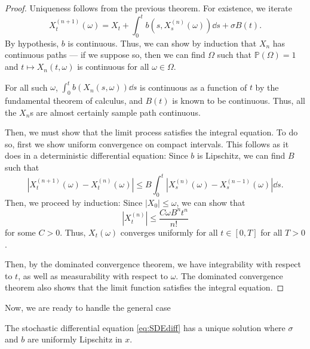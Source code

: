 \documentclass[prb,12pt]{revtex4-2}
\theoremstyle{definition}
\theoremstyle{definition}
\theoremstyle{definition}
\begin{document}
\begin{proof}
	Uniqueness follows from the previous theorem. For existence, we iterate
	\[
	X^{(n+1)}_t(\omega)=X_t+\int_0^t b(s, X^{(n)}_s(\omega))\dd{s}+\sigma B(t)
	.\] 
	By hypothesis, $b$ is continuous. Thus, we can show by induction that $X_n$ has continuous paths --- if we suppose so, then we can find $\Omega$ such that $\mathbb{P}(\Omega)=1$ and $t\mapsto X_n(t, \omega)$ is continuous for all $\omega\in \Omega$. 

	For all such $\omega$, $\int_0^t b(X_n(s, \omega))\dd{s}$ is continuous as a function of $t$ by the fundamental theorem of calculus, and $B(t)$ is known to be continuous. Thus, all the $X_n$s are almost certainly sample path continuous.

	Then, we must show that the limit process satisfies the integral equation. To do so, first we show uniform convergence on compact intervals. This follows as it does in a deterministic differential equation: Since $b$ is Lipschitz, we can find $B$ such that
	\[
	|X^{(n+1)}_t(\omega)-X^{(n)}_t(\omega)| \le B \int_0^t |X^{(n)}_s(\omega) - X^{(n-1)}_s(\omega)|\dd{s} 
	.\] 
	Then, we proceed by induction: Since $|X_0|\le \omega$, we can show that
	\[
	|X^{(n)}_t| \le \frac{C \omega B^n t^n}{n!}
	\]
	for some $C>0$. Thus, $X_t(\omega)$ converges uniformly for all $t\in [0,T]$ for all $T>0$. 

	Then, by the dominated convergence theorem, we have integrability with respect to $t$, as well as measurability with respect to $\omega$. The dominated convergence theorem also shows that the limit function satisfies the integral equation.
\end{proof}
Now, we are ready to handle the general case
\begin{Theorem}
	The stochastic differential equation \eqref{eq:SDEdiff} has a unique solution where $\sigma$ and $b$ are uniformly Lipschitz in $x$.
\end{Theorem}
\end{document}
